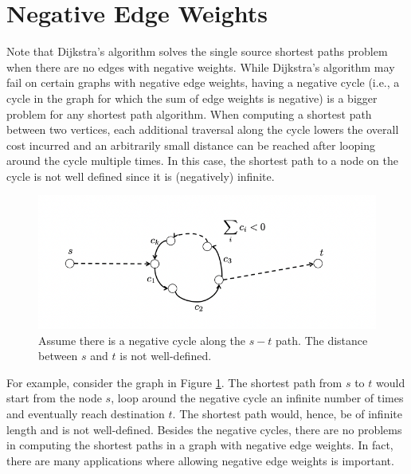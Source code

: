 \documentclass [12pt]{article}
\theoremstyle{definition}
\begin{document}
\section{Negative Edge Weights}
Note that Dijkstra's algorithm solves the single source shortest paths problem when there
are no edges with negative weights. While Dijkstra's algorithm may fail on certain graphs
with negative edge weights, having a negative cycle (i.e., a cycle in the graph for which the
sum of edge weights is negative) is a bigger problem for any shortest path algorithm. When
computing a shortest path between two vertices, each additional traversal along the cycle
lowers the overall cost incurred and an arbitrarily small distance can be reached after looping
around the cycle multiple times. In this case, the shortest path to a node on the cycle is not
well defined since it is (negatively) infinite.

\begin{figure}[h!]
\centering
\includegraphics[scale=0.5]{negative_cycle.png}
\caption{Assume there is a negative cycle along the $s-t$ path. The distance between $s$ and
$t$ is not well-defined.}
\label{fig:negative_cycle}
\end{figure}

For example, consider the graph in Figure \ref{fig:negative_cycle}. The shortest path from $s$ to $t$ would start from the node $s$, loop around the negative cycle an infinite number of times and eventually reach destination $t$. The shortest path would, hence, be of infinite length and is not well-defined. Besides the negative cycles, there are no problems in computing the shortest paths in a graph with negative edge weights. In fact, there are many applications where allowing negative edge weights is important.
\end{document}
